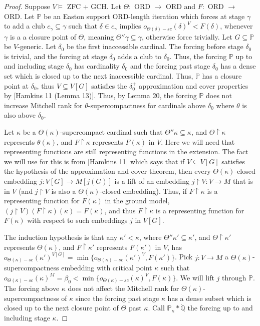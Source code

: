 \documentclass[10pt,leqno]{amsart}
\begin{document}
\begin{proof} Suppose $V \models$ ZFC + GCH. Let $\Theta:$ ORD $\to$ ORD and $F:$ ORD $\to$ ORD. Let $\mathbb{P}$ be an Easton support ORD-length iteration which forces at stage $\gamma$ to add a club $c_{\gamma} \subseteq \gamma$ such that $\delta \in c_{\gamma}$ implies $o_{\Theta(\delta)-sc}(\delta)^V < F(\delta)$, whenever $\gamma$ is a a closure point of $\Theta$, meaning $\Theta''\gamma \subseteq \gamma$, otherwise force trivially. Let $G \subseteq \mathbb{P}$ be $V$-generic. Let $\delta_0$ be the first inaccessible cardinal. The forcing before stage $\delta_0$ is trivial, and the forcing at stage $\delta_0$ adds a club to $\delta_0$. Thus, the forcing $\mathbb{P}$ up to and including stage $\delta_0$ has cardinality $\delta_0$ and the forcing past stage $\delta_0$ has a dense set which is closed up to the next inaccessible cardinal. Thus, $\mathbb{P}$ has a closure point at $\delta_0$, thus $V \subseteq V[G]$ satisfies the $\delta_0^+$ approximation and cover properties by [Hamkins 11 (Lemma 13)]. Thus, by Lemma 20, the forcing $\mathbb{P}$ does not increase Mitchell rank for $\theta$-supercompactness for cardinals above $\delta_0$ where $\theta$ is also above $\delta_0$. 

Let $\kappa$ be a $\Theta(\kappa)$-supercompact cardinal such that $\Theta''\kappa \subseteq \kappa$, and $\Theta \upharpoonright \kappa$ represents $\theta(\kappa)$, and $F \upharpoonright \kappa$ represents $F(\kappa)$ in $V$. Here we will need that representing functions are still representing functions in the extension. The fact we will use for this is from [Hamkins 11] which says that if $V \subseteq V[G]$ satisfies the hypothesis of the approximation and cover theorem, then every $\Theta(\kappa)$-closed embedding $j:V[G] \to M[j(G)]$ is a lift of an embedding $j \upharpoonright V : V \to M$ that is in $V$ (and $j \upharpoonright V$ is also a $\Theta(\kappa)$-closed embedding). Thus, if $F \upharpoonright \kappa$ is a representing function for $F(\kappa)$ in the ground model, $(j \upharpoonright V)(F \upharpoonright \kappa)(\kappa) = F(\kappa)$, and thus $F \upharpoonright \kappa$ is a representing function for $F(\kappa)$ with respect to such embeddings $j$
 in $V[G]$. 

 The induction hypothesis is that any $\kappa' < \kappa$, where $\Theta''\kappa' \subseteq \kappa'$, and $\Theta \upharpoonright \kappa'$ represents $\Theta(\kappa)$, and $F \upharpoonright \kappa'$ represents $F(\kappa')$ in $V$, has $o_{\Theta(\kappa)-sc}(\kappa')^{V[G]} = \min\{o_{\Theta(\kappa)-sc}(\kappa')^V, F(\kappa')\}$. Pick $j:V \to M$ a $\Theta(\kappa)$-supercompactness embedding with critical point $\kappa$ such that $o_{\Theta(\kappa)-sc}(\kappa)^M = \beta_0 < \min\{o_{\Theta(\kappa)-sc}(\kappa)^V, F(\kappa)\}$. We will lift $j$ through $\mathbb{P}$. The forcing above $\kappa$ does not affect the Mitchell rank for $\Theta(\kappa)$-supercompactness of $\kappa$ since the forcing past stage $\kappa$ has a dense subset which is closed up to the next closure point of $\Theta$ past $\kappa$. Call $\mathbb{P}_{\kappa}*\dot{\mathbb{Q}}$ the forcing up to and including stage $\kappa$.


\end{proof}
\end{document}
